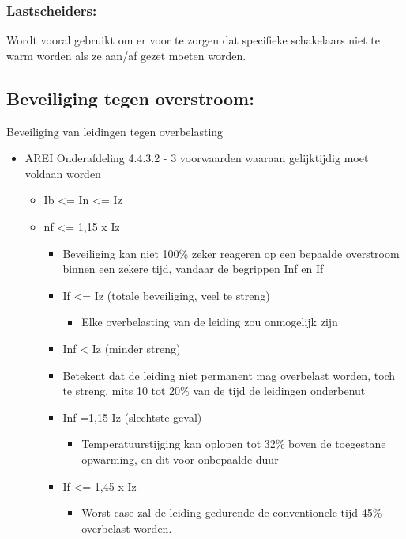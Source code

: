 \documentclass[12pt]{article}
\begin{document}
\subsubsection{Lastscheiders:}
Wordt vooral gebruikt om er voor te zorgen dat specifieke schakelaars niet te warm worden als ze aan/af gezet moeten worden.
\subsection{Beveiliging tegen overstroom:}
Beveiliging van leidingen tegen overbelasting\begin{itemize}
    \item AREI Onderafdeling 4.4.3.2 - 3 voorwaarden waaraan gelijktijdig moet voldaan worden\begin{itemize}
        \item Ib <= In <= Iz
        \item nf <= 1,15 x Iz\begin{itemize}
            \item Beveiliging kan niet 100\% zeker reageren op een bepaalde overstroom binnen een zekere tijd, vandaar de begrippen Inf en If
            \item If <= Iz (totale beveiliging, veel te streng)\begin{itemize}
                \item Elke overbelasting van de leiding zou onmogelijk zijn
            \end{itemize}
            \item Inf < Iz (minder streng)
            \item Betekent dat de leiding niet permanent mag overbelast worden, toch te streng, mits 10 tot 20\% van de tijd de leidingen onderbenut
            \item Inf =1,15 Iz (slechtste geval)\begin{itemize}
                \item Temperatuurstijging kan oplopen tot 32\% boven de toegestane opwarming, en dit voor onbepaalde duur
            \end{itemize}
            \item If <= 1,45 x Iz\begin{itemize}
                \item Worst case zal de leiding gedurende de conventionele tijd 45\% overbelast worden.
            \end{itemize}
        \end{itemize}
    \end{itemize}
\end{itemize}
\end{document}

